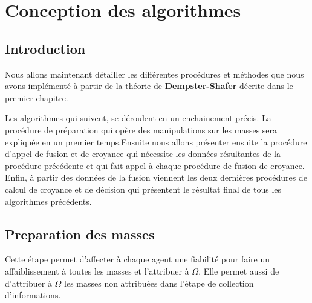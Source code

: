 \chapter{Conception des algorithmes}

{}
\section*{Introduction}

Nous allons maintenant détailler les différentes procédures et méthodes que nous avons implémenté à partir de la théorie de\textbf{ Dempster-Shafer} décrite dans le premier chapitre.

Les algorithmes qui suivent, se déroulent en un enchainement précis.
La procédure de préparation qui opère des manipulations sur les masses sera expliquée en un premier temps.Ensuite nous allons présenter  ensuite la procédure d'appel de fusion et de croyance qui nécessite les données résultantes de la procédure précédente et qui fait appel à chaque procédure de fusion de croyance. Enfin, à partir des données de la fusion viennent les deux dernières procédures de calcul de croyance et de décision qui présentent le résultat final de tous les algorithmes précédents.

\DontPrintSemicolon
\section{Preparation des masses}
Cette étape permet d'affecter à chaque agent une fiabilité pour faire un affaiblissement à toutes les masses et l'attribuer à $\Omega$. Elle permet aussi de d'attribuer à $\Omega$ les masses non attribuées dans l'étape de collection d'informations.   

